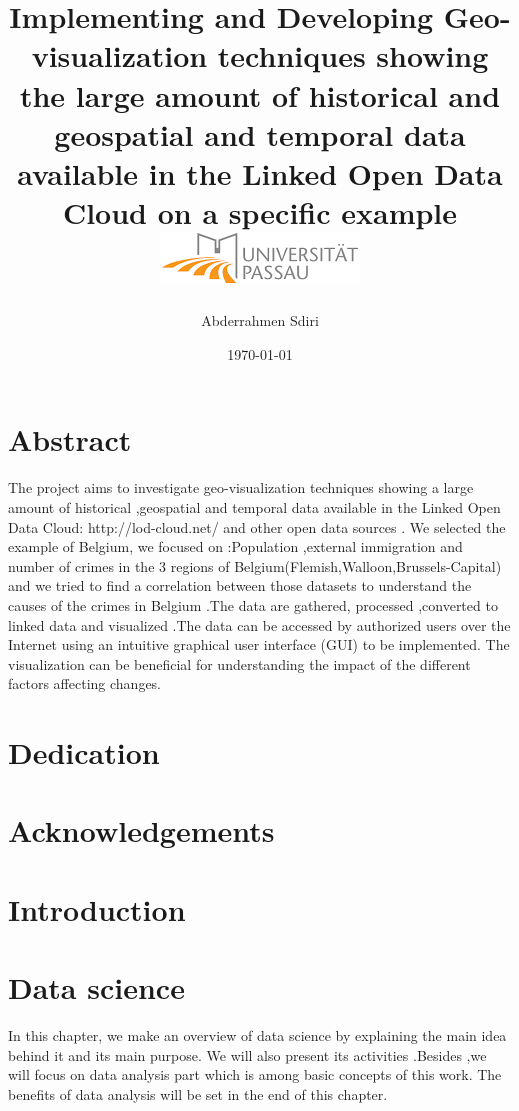 \documentclass[a4paper,12pt,oneside]{report}
\begin{document}
\title{
{ Implementing and Developing Geo-visualization techniques showing the large amount of historical and geospatial and temporal data available in the Linked Open Data Cloud on a specific example }\\
{\includegraphics{university.png}}}
\author{Abderrahmen Sdiri}
\date{\today}
\maketitle
\chapter*{Abstract}
{The project aims to investigate geo-visualization techniques showing a large amount of historical ,geospatial and temporal data available in the Linked Open Data Cloud: http://lod-cloud.net/ and other open data sources . We selected the example of Belgium, we focused on :Population ,external immigration and number of  crimes  in the 3 regions of Belgium(Flemish,Walloon,Brussels-Capital) and we tried to find a  correlation between those datasets to understand the causes of the crimes in Belgium .The data are gathered, processed ,converted to linked data  and visualized .The data  can be accessed by authorized users over the Internet using an intuitive graphical user interface (GUI) to be implemented. The visualization can be beneficial for understanding the impact of the different factors affecting changes.}
\chapter*{Dedication}
\chapter*{Acknowledgements}
\tableofcontents
\listoffigures
\listoftables
\newpage
{}
 \chapter{Introduction}
\newpage
\chapter{Data science}
{In this chapter, we make an overview of data science by explaining the main idea behind it and its main purpose. We will also  present its activities .Besides ,we will focus  on data analysis part  which is among basic concepts of this work. The benefits of data analysis will be set in the end of this chapter.}
\end{document}
